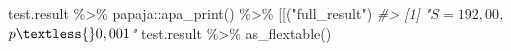 \documentclass[
]{book}
\newenvironment{Shaded}{\begin{snugshade}}{\end{snugshade}}
\newcommand{\AttributeTok}[1]{\textcolor[rgb]{0.77,0.63,0.00}{#1}}
\newcommand{\CommentTok}[1]{\textcolor[rgb]{0.56,0.35,0.01}{\textit{#1}}}
\newcommand{\FunctionTok}[1]{\textcolor[rgb]{0.00,0.00,0.00}{#1}}
\newcommand{\NormalTok}[1]{#1}
\newcommand{\SpecialCharTok}[1]{\textcolor[rgb]{0.00,0.00,0.00}{#1}}
\newcommand{\StringTok}[1]{\textcolor[rgb]{0.31,0.60,0.02}{#1}}
\begin{document}
\begin{Shaded}
\begin{Highlighting}[]
\NormalTok{test.result }\SpecialCharTok{\%\textgreater{}\%}\NormalTok{ papaja}\SpecialCharTok{::}\FunctionTok{apa\_print}\NormalTok{() }\SpecialCharTok{\%\textgreater{}\%} \StringTok{\textasciigrave{}}\AttributeTok{[[}\StringTok{\textasciigrave{}}\NormalTok{(}\StringTok{"full\_result"}\NormalTok{)}
\CommentTok{\#\textgreater{} [1] "$S = 192,00$, $p \textless{} 0,001$"}
\NormalTok{test.result }\SpecialCharTok{\%\textgreater{}\%} \FunctionTok{as\_flextable}\NormalTok{()}
\end{Highlighting}
\end{Shaded}

\providecommand{\docline}[3]{\noalign{\global\setlength{\arrayrulewidth}{#1}}\arrayrulecolor[HTML]{#2}\cline{#3}}

\setlength{\tabcolsep}{2pt}

\renewcommand*{\arraystretch}{1.5}
\end{document}
